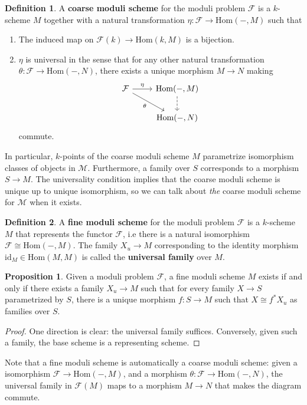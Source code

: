 \documentclass{article}
\newcommand{\id}{\textrm{id}}
\theoremstyle{definition}
\theoremstyle{definition}
\newtheorem{definition}{Definition}[theorem]
\theoremstyle{definition}
\theoremstyle{definition}
\newtheorem{proposition}{Proposition}[theorem]
\theoremstyle{definition}
\theoremstyle{definition}
\theoremstyle{definition}
\begin{document}
\begin{definition}
	A \textbf{coarse moduli scheme} for the moduli problem $\mathcal{F}$ is a $k$-scheme $M$ together with a natural transformation $\eta: \mathcal{F}\to \textrm{Hom}(-, M)$ such that
	\begin{enumerate}
		\item The induced map on $\mathcal{F}(k)\to \textrm{Hom}(k, M)$ is a bijection.
		\item $\eta$ is universal in the sense that for any other natural transformation $\theta: \mathcal{F}\to \textrm{Hom}(-, N)$, there exists a unique morphism $M\to N$ making 
		\[\begin{tikzcd}
	{\mathcal{F}} & {\mathrm{Hom}(-,M)} \\
	& {\mathrm{Hom}(-,N)}
	\arrow["\eta", from=1-1, to=1-2]
	\arrow["\theta"', from=1-1, to=2-2]
	\arrow[dashed, from=1-2, to=2-2]
\end{tikzcd}\]
		commute.
	\end{enumerate}
\end{definition}
In particular, $k$-points of the coarse moduli scheme $M$ parametrize isomorphism classes of objects in $\mathcal{M}$. Furthermore, a family over $S$ corresponds to a morphism $S\to M$. The universality condition implies that the coarse moduli scheme is unique up to unique isomorphism, so we can talk about \textit{the} coarse moduli scheme for $\mathcal{M}$ when it exists. 
\begin{definition}
	A \textbf{fine moduli scheme} for the moduli problem $\mathcal{F}$ is a $k$-scheme $M$ that represents the functor $\mathcal{F}$, i.e there is a natural isomorphism $\mathcal{F}\cong \textrm{Hom}(-, M)$. The family $X_u\to M$
	corresponding to the identity morphism $\id_M\in \textrm{Hom}(M,M)$ is called the \textbf{universal family} over $M$.
\end{definition}

\begin{proposition}
	Given a moduli problem $\mathcal{F}$, a fine moduli scheme $M$ exists if and only if there exists a family $X_u\to M$ such that for every family $X\to S$ parametrized by $S$, there is a unique morphism $f: S\to M$ such that $X\cong f^* X_u$ as families over $S$.
\end{proposition}
\begin{proof}
	One direction is clear: the universal family suffices. Conversely, given such a family, the base scheme is a representing scheme. 
\end{proof}
Note that a fine moduli scheme is automatically a coarse moduli scheme: given a isomorphism $\mathcal{F}\to \textrm{Hom}(-, M)$, and a morphism $\theta: \mathcal{F}\to \textrm{Hom}(-, N)$, the universal family in $\mathcal{F}(M)$ maps to a morphism $M\to N$ that makes the diagram commute.
\end{document}
